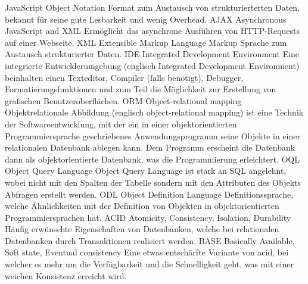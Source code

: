   {JavaScript Object Notation}  %
  {Format zum Austausch von strukturierterten Daten, bekannt für seine gute Lesbarkeit und wenig Overhead.}
  {AJAX}               %
  {Asynchronous JavaScript and XML}  %
  {Ermöglicht das asynchrone Ausführen von HTTP-Requests auf einer Webseite.}
  {XML}               %
  {Extensible Markup Language}  %
  {Markup Sprache zum Austausch strukturierter Daten.}
  {IDE}               %
  {Integrated Development Environment}  %
  {Eine integrierte Entwicklerumgebung (englisch Integrated Development Environment) beinhalten einen Texteditor, 
Compiler (falls benötigt), Debugger, Formatierungsfunktionen und zum Teil die Möglichkeit zur Erstellung von grafischen 
Benutzeroberflächen.}
  {ORM}               %
  {Object-relational mapping}  %
  {Objektrelationale Abbildung (englisch object-relational mapping) ist eine Technik der Softwareentwicklung, mit der ein in einer 
objektorientierten Programmiersprache geschriebenes Anwendungsprogramm seine Objekte in einer relationalen Datenbank ablegen 
kann. Dem Programm erscheint die Datenbank dann als objektorientierte Datenbank, was die Programmierung erleichtert. 
\cite{wiki_orm}}
  {OQL}               %
  {Object Query Language}  %
  {Object Query Language ist stark an SQL angelehnt, wobei nicht mit den Spalten der Tabelle sondern mit den Attributen des Objekts 
Abfragen erstellt werden.}
  {ODL}               %
  {Object Definition Language}  %
  {Definitionssprache, welche Ähnlichkeiten mit der Definition von Objekten in objektorientierten Programmiersprachen hat.}
  {ACID}               %
  {Atomicity, Consistency, Isolation, Durability}  %
  {Häufig erwünschte Eigenschaften von Datenbanken, welche bei relationalen Datenbanken durch Transaktionen realisiert werden.}
  {BASE}               %
  {Basically Available, Soft state, Eventual consistency}  %
  {Eine etwas entschärfte Variante von \gls{acid}, bei welcher es mehr um die Verfügbarkeit und die Schnelligkeit geht, was mit einer 
weichen Konsistenz erreicht wird.}

